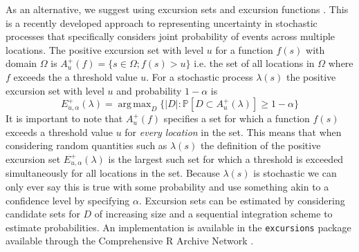\documentclass[preprint,12pt]{elsarticle}
\DeclareMathOperator*{\argmax}{arg\,max}  %
\begin{document}
As an alternative, we suggest using excursion sets and excursion functions \citep{bolin_excursion_2015}.  This is a recently developed approach to representing uncertainty in stochastic processes that specifically considers joint probability of events across multiple locations.  The positive excursion set with level $u$ for a function $f(s)$ with domain $\Omega$ is $A_u^{+}(f) = \{ s \in \Omega ; f(s) > u \}$ i.e. the set of all locations in $\Omega$ where $f$ exceeds the a threshold value $u$. For a stochastic process $\lambda(s)$ the positive excursion set with level $u$ and probability $1 - \alpha$ is
\begin{equation*}
E_{u,\alpha}^{+}(\lambda) = \argmax_{D}\{\lvert D \rvert : \mathbb{P}\left[D \subset A_u^{+}(\lambda)\right] \geq 1 - \alpha \}
\end{equation*}
It is important to note that $A_u^{+}(f)$ specifies a set for which a function $f(s)$ exceeds a threshold value $u$ for \textit{every location} in the set.  This means that when considering random quantities such as $\lambda(s)$ the definition of the positive excursion set $E_{u,\alpha}^{+}(\lambda)$ is the largest such set for which a threshold is exceeded simultaneously for all locations in the set.  Because $\lambda(s)$ is stochastic we can only ever say this is true with some probability and use something akin to a confidence level by specifying $\alpha$.  Excursion sets can be estimated by considering candidate sets for $D$ of increasing size and a sequential integration scheme to estimate probabilities.  An implementation is available in the \texttt{excursions} package \citep{bolin_calculating_2018} available through the Comprehensive R Archive Network \citep{r_2017}.
\end{document}
